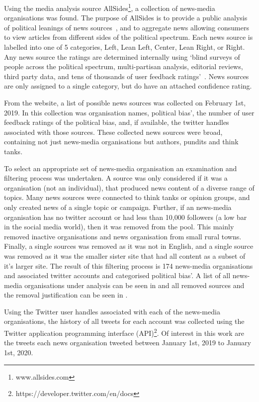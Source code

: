 Using the media analysis source AllSides\footnote{www.allsides.com}, a collection of news-media organisations was found. The purpose of AllSides is to provide a public analysis of political leanings of news sources~, and to aggregate news allowing consumers to view articles from different sides of the political spectrum. Each news source is labelled into one of 5 categories, Left, Lean Left, Center, Lean Right, or Right. Any news source the ratings are determined internally using `blind surveys of people across the political spectrum, multi-partisan analysis, editorial reviews, third party data, and tens of thousands of user feedback ratings'~. News sources are only assigned to a single category, but do have an attached confidence rating.

From the website, a list of possible news sources was collected on February 1st, 2019. In this collection was organisation names, political bias', the number of user feedback ratings of the political bias, and, if available, the twitter handles associated with those sources. These collected news sources were broad, containing not just news-media organisations but authors, pundits and think tanks. 

To select an appropriate set of news-media organisation an examination and filtering process was undertaken. A source was only considered if it was a organisation (not an individual), that produced news content of a diverse range of topics. Many news sources were connected to think tanks or opinion groups, and only created news of a single topic or campaign. Further, if an news-media organisation has no twitter account or had less than 10,000 followers (a low bar in the social media world), then it was removed from the pool. This mainly removed inactive organisations and news organisation from small rural towns. Finally, a single sources was removed as it was not in English, and a single source was removed as it was the smaller sister site that had all content as a subset of it's larger site.  The result of this filtering process is 174 news-media organisations and associated twitter accounts and categorised political bias'.  A list of all news-media organisations under analysis can be seen in \cite{app:accounts} and all removed sources and the removal justification can be seen in .

Using the Twitter user handles associated with each of the news-media organisations, the history of all tweets for each account was collected using the Twitter application programming interface (API)\footnote{https://developer.twitter.com/en/docs}. Of interest in this work are the tweets each news organisation tweeted between January 1st, 2019 to January 1st, 2020. 

